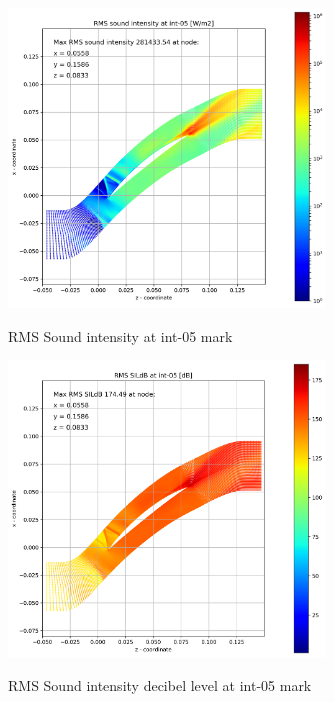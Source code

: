 \begin{figure}[ht]
  \centering
  \includegraphics[width=0.75\textwidth]{Figures/int-05-rms-sil.png} \label{int-05-rms-sil}
  \caption{RMS Sound intensity at int-05 mark}
  
  \vspace*{\floatsep}%

  \includegraphics[width=0.75\textwidth]{Figures/int-05-rms-sildb.png} \label{int-05-rms-sildb}
  \caption{RMS Sound intensity decibel level at int-05 mark}
\end{figure}


